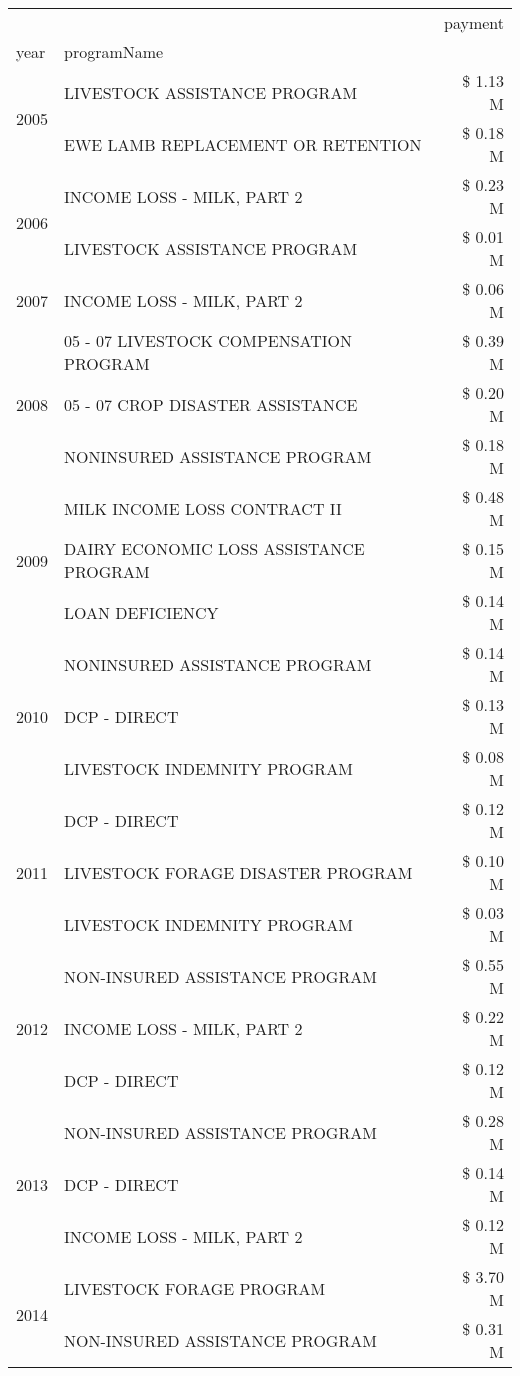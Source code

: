 \begin{tabular}{llr}
\toprule
 &  & payment \\
year & programName &  \\
\midrule
\multirow[t]{2}{*}{2005} & LIVESTOCK ASSISTANCE PROGRAM & \$ 1.13 M \\
 & EWE LAMB REPLACEMENT OR RETENTION & \$ 0.18 M \\
\cline{1-3}
\multirow[t]{2}{*}{2006} & INCOME LOSS - MILK, PART 2 & \$ 0.23 M \\
 & LIVESTOCK ASSISTANCE PROGRAM & \$ 0.01 M \\
\cline{1-3}
2007 & INCOME LOSS - MILK, PART 2 & \$ 0.06 M \\
\cline{1-3}
\multirow[t]{3}{*}{2008} & 05 - 07 LIVESTOCK COMPENSATION PROGRAM & \$ 0.39 M \\
 & 05 - 07 CROP DISASTER ASSISTANCE & \$ 0.20 M \\
 & NONINSURED ASSISTANCE PROGRAM & \$ 0.18 M \\
\cline{1-3}
\multirow[t]{3}{*}{2009} & MILK INCOME LOSS CONTRACT II & \$ 0.48 M \\
 & DAIRY ECONOMIC LOSS ASSISTANCE PROGRAM & \$ 0.15 M \\
 & LOAN DEFICIENCY & \$ 0.14 M \\
\cline{1-3}
\multirow[t]{3}{*}{2010} & NONINSURED ASSISTANCE PROGRAM & \$ 0.14 M \\
 & DCP - DIRECT & \$ 0.13 M \\
 & LIVESTOCK INDEMNITY PROGRAM & \$ 0.08 M \\
\cline{1-3}
\multirow[t]{3}{*}{2011} & DCP - DIRECT & \$ 0.12 M \\
 & LIVESTOCK FORAGE DISASTER PROGRAM & \$ 0.10 M \\
 & LIVESTOCK INDEMNITY PROGRAM & \$ 0.03 M \\
\cline{1-3}
\multirow[t]{3}{*}{2012} & NON-INSURED ASSISTANCE PROGRAM & \$ 0.55 M \\
 & INCOME LOSS - MILK, PART 2 & \$ 0.22 M \\
 & DCP - DIRECT & \$ 0.12 M \\
\cline{1-3}
\multirow[t]{3}{*}{2013} & NON-INSURED ASSISTANCE PROGRAM & \$ 0.28 M \\
 & DCP - DIRECT & \$ 0.14 M \\
 & INCOME LOSS - MILK, PART 2 & \$ 0.12 M \\
\cline{1-3}
\multirow[t]{3}{*}{2014} & LIVESTOCK FORAGE PROGRAM & \$ 3.70 M \\
 & NON-INSURED ASSISTANCE PROGRAM & \$ 0.31 M \\

\end{tabular}

